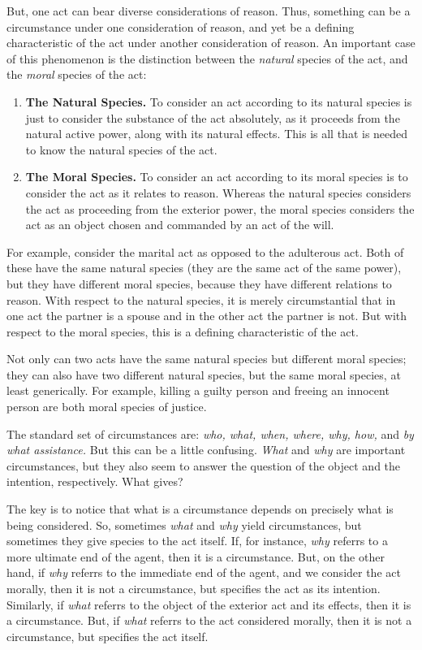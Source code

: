\documentclass{article}
\begin{document}
But, one act can bear diverse considerations of reason. Thus, something can be a circumstance under one consideration of
reason, and yet be a defining characteristic of the act under another consideration of reason. An important case of this
phenomenon is the distinction between the \emph{natural} species of the act, and the \emph{moral} species of the act:

\begin{enumerate}

    \item \textbf{The Natural Species.} To consider an act according to its natural species is just to consider the
        substance of the act absolutely, as it proceeds from the natural active power, along with its natural effects.
        This is all that is needed to know the natural species of the act.

    \item \textbf{The Moral Species.}  To consider an act according to its moral species is to consider the act as it
        relates to reason. Whereas the natural species considers the act as proceeding from the exterior power, the
        moral species considers the act as an object chosen and commanded by an act of the will.

\end{enumerate}

For example, consider the marital act as opposed to the adulterous act. Both of these have the same natural species
(they are the same act of the same power), but they have different moral species, because they have different relations
to reason. With respect to the natural species, it is merely circumstantial that in one act the partner is a spouse and
in the other act the partner is not. But with respect to the moral species, this is a defining characteristic of the
act.

Not only can two acts have the same natural species but different moral species; they can also have two different
natural species, but the same moral species, at least generically. For example, killing a guilty person and freeing an
innocent person are both moral species of justice.

The standard set of circumstances are:  \emph{who, what, when, where, why, how,} and \emph{by what assistance.} But this
can be a little confusing. \emph{What} and \emph{why} are important circumstances, but they also seem to answer the
question of the object and the intention, respectively. What gives?

The key is to notice that what is a circumstance depends on precisely what is being considered. So, sometimes
\emph{what} and \emph{why} yield circumstances, but sometimes they give species to the act itself. If, for instance,
\emph{why} referrs to a more ultimate end of the agent, then it is a circumstance. But, on the other hand, if \emph{why}
referrs to the immediate end of the agent, and we consider the act morally, then it is not a circumstance, but specifies
the act as its intention. Similarly, if \emph{what} referrs to the object of the exterior act and its effects, then it
is a circumstance. But, if \emph{what} referrs to the act considered morally, then it is not a circumstance, but
specifies the act itself.
\end{document}

